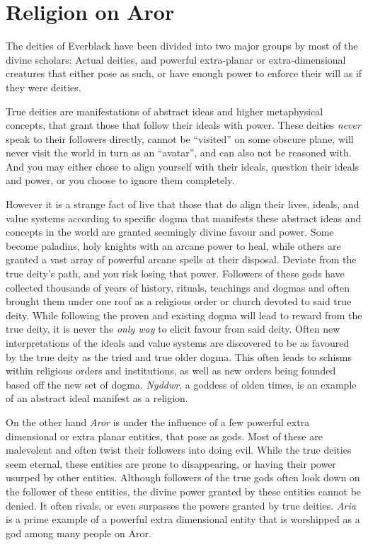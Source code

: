 \section*{Religion on Aror}

The deities of Everblack have been divided into two major groups by most of
the divine scholars: Actual deities, and powerful extra-planar or
extra-dimensional creatures that either pose as such, or have enough power to
enforce their will as if they were deities.

True deities are manifestations of abstract ideas and higher metaphysical
concepts, that grant those that follow their ideals with power. These deities
\emph{never} speak to their followers directly, cannot be ``visited'' on some
obscure plane, will never visit the world in turn as an ``avatar'', and can
also not be reasoned with. And you may either chose to align yourself with
their ideals, question their ideals and power, or you choose to ignore them
completely.

However it is a strange fact of live that those that do align their lives,
ideals, and value systems according to specific dogma that manifests these
abstract ideas and concepts in the world are granted seemingly divine favour
and power. Some become paladins, holy knights with an arcane power to heal,
while others are granted a vast array of powerful arcane spells at their
disposal. Deviate from the true deity's path, and you risk losing that
power. Followers of these gods have collected thousands of years of history,
rituals, teachings and dogmas and often brought them under one roof as a
religious order or church devoted to said true deity. While following the
proven and existing dogma will lead to reward from the true deity, it is never
the \emph{only way} to elicit favour from said deity. Often new
interpretations of the ideals and value systems are discovered to be as
favoured by the true deity as the tried and true older dogma. This often leads
to schisms within religious orders and institutions, as well as new orders
being founded based off the new set of dogma. \emph{Nyddwr}, a goddess of
olden times, is an example of an abstract ideal manifest as a religion.

On the other hand \emph{Aror} is under the influence of a few powerful extra
dimensional or extra planar entities, that pose as gods. Most of these are
malevolent and often twist their followers into doing evil. While the true
deities seem eternal, these entities are prone to disappearing, or having
their power usurped by other entities. Although followers of the true gods
often look down on the follower of these entities, the divine power granted
by these entities cannot be denied. It often rivals, or even surpasses the
powers granted by true deities. \emph{Aria} is a prime example of a powerful
extra dimensional entity that is worshipped as a god among many people on
Aror.


